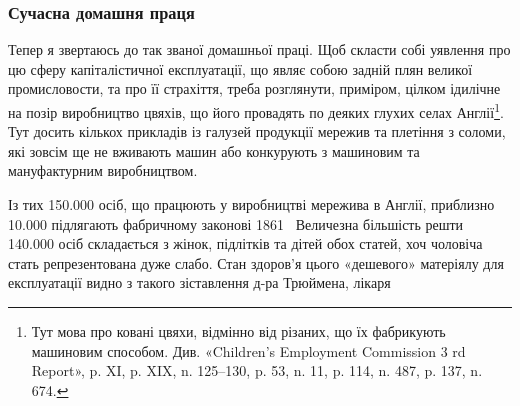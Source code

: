 \vspace{-2\bigskipamount}
\subsubsection{Сучасна домашня праця}

Тепер я звертаюсь до так званої домашньої праці. Щоб скласти
собі уявлення про цю сферу капіталістичної експлуатації, що
являє собою задній плян великої промисловости, та про її страхіття,
треба розглянути, приміром, цілком ідилічне на позір виробництво
цвяхів, що його провадять по деяких глухих селах Англії\footnote{
Тут мова про ковані цвяхи, відмінно від різаних, що їх фабрикують
машиновим способом. Див. «Children’s Employment Commission
3 rd Report», p. XI, p. XIX, n. 125--130, p. 53, n. 11, p. 114, n. 487,
p. 137, n. 674.
}.
Тут досить кількох прикладів із галузей продукції мережив та
плетіння з соломи, які зовсім ще не вживають машин або конкурують
з машиновим та мануфактурним виробництвом.

Із тих \num{150.000} осіб, що працюють у виробництві мережива в
Англії, приблизно \num{10.000} підлягають фабричному законові 1861~
Величезна більшість решти \num{140.000} осіб складається з жінок,
підлітків та дітей обох статей, хоч чоловіча стать репрезентована
дуже слабо. Стан здоров’я цього «дешевого» матеріялу для експлуатації
видно з такого зіставлення д-ра Трюймена, лікаря
\parbreak{}  %
